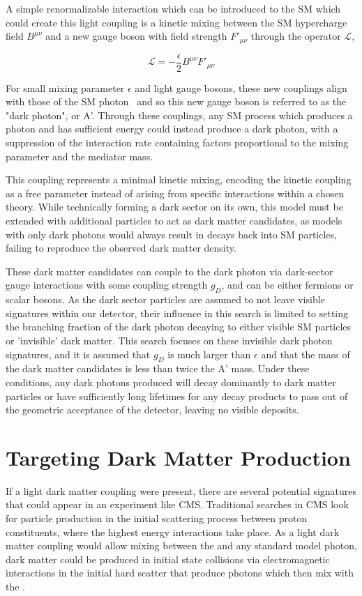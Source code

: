 A simple renormalizable interaction which can be introduced to the SM which could create this light coupling is a kinetic mixing between the SM hypercharge field $B^{\mu\nu}$ and a new gauge boson with field strength $F'_{\mu\nu}$ through the operator $\mathcal{L}$,  

\begin{equation}
	\label{eq:LDMlagrangian}
	\mathcal{L} = - \frac{\epsilon}{2} B^{\mu\nu}F'_{\mu\nu}
\end{equation}

For small mixing parameter $\epsilon$ and light gauge bosons, these new couplings align with those of the SM photon~\cite{Bauer_2018} and so this new gauge boson is referred to as the "dark photon", or A'.
Through these couplings, any SM process which produces a photon and has sufficient energy could instead produce a dark photon, with a suppression of the interaction rate containing factors proportional to the mixing parameter and the mediator mass.

This coupling represents a minimal kinetic mixing, encoding the kinetic coupling as a free parameter instead of arising from specific interactions within a chosen theory. 
While technically forming a dark sector on its own, this model must be extended with additional particles to act as dark matter candidates, as models with only dark photons would always result in decays back into SM particles, failing to reproduce the observed dark matter density.

These dark matter candidates can couple to the dark photon via dark-sector gauge interactions with some coupling strength $g_D$, and can be either fermions or scalar bosons.
As the dark sector particles are assumed to not leave visible signatures within our detector, their influence in this search is limited to setting the branching fraction of the dark photon decaying to either visible SM particles or 'invisible' dark matter.
This search focuses on these invisible dark photon signatures, and it is assumed that $g_D$ is much larger than $\epsilon$ and that the mass of the dark matter candidates is less than twice the A' mass.
Under these conditions, any dark photons produced will decay dominantly to dark matter particles or have sufficiently long lifetimes for any decay products to pass out of the geometric acceptance of the detector, leaving no visible deposits.

\section{Targeting Dark Matter Production}
If a light dark matter coupling were present, there are several potential signatures that could appear in an experiment like CMS.
Traditional searches in CMS look for particle production in the initial scattering process between proton constituents, where the highest energy interactions take place.
As a light dark matter coupling would allow mixing between the \aprime and any standard model photon, dark matter could be produced in initial state collisions via electromagnetic interactions in the initial hard scatter that produce photons which then mix with the \aprime.

